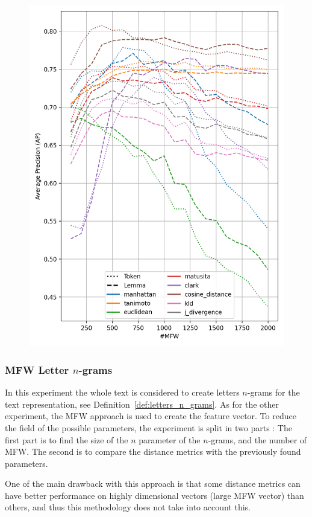 \begin{figure}
  \label{fig:token_vs_lemma_st_jean}
  \includegraphics[width=0.9\linewidth]{img/token_vs_lemma_st_jean.png}
\end{figure}

\subsubsection{MFW Letter $n$-grams}

In this experiment the whole text is considered to create letters $n$-grams for the text representation, see Definition~\ref{def:letters_n_grams}.
As for the other experiment, the MFW approach is used to create the feature vector.
To reduce the field of the possible parameters, the experiment is split in two parts :
The first part is to find the size of the $n$ parameter of the $n$-grams, and the number of MFW.
The second is to compare the distance metrics with the previously found parameters.

One of the main drawback with this approach is that some distance metrics can have better performance on highly dimensional vectors (large MFW vector) than others, and thus this methodology does not take into account this.

